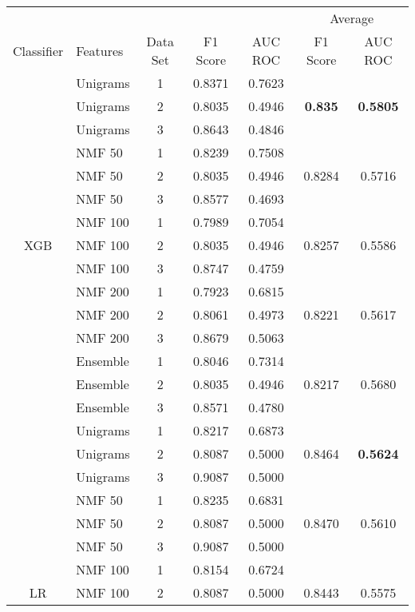 \documentclass[12pt, twoside]{article}
\begin{document}
\begin{table}[!htbp]
  \centering
  \begin{tabular}{clccccc}
  \toprule
  {} & {} &	{}	& {}	&	{} & \multicolumn{2}{c}{Average} \\
  \cmidrule(r){6-7}
  Classifier	&	Features	&	Data Set	&	F1 Score	&	AUC ROC	&	F1 Score	&	AUC ROC \\
  \midrule
  	&	Unigrams	&	1	&	0.8371	&	0.7623	&		&	 \\
  	&	Unigrams	&	2	&	0.8035	&	0.4946	&	\textbf{0.835}	&	\textbf{0.5805} \\
  	&	Unigrams	&	3	&	0.8643	&	0.4846	&		&	 \\
  	\cmidrule(r){2-7}
  	&	NMF 50	&	1	&	0.8239	&	0.7508	&		&	 \\
  	&	NMF 50	&	2	&	0.8035	&	0.4946	&	0.8284	&	0.5716 \\
  	&	NMF 50	&	3	&	0.8577	&	0.4693	&		&	 \\
  	\cmidrule(r){2-7}
  	&	NMF 100	&	1	&	0.7989	&	0.7054	&		&	 \\
  XGB	&	NMF 100	&	2	&	0.8035	&	0.4946	&	0.8257	&	0.5586 \\
  	&	NMF 100	&	3	&	0.8747	&	0.4759	&		&	 \\
  	\cmidrule(r){2-7}
  	&	NMF 200	&	1	&	0.7923	&	0.6815	&		&	 \\
  	&	NMF 200	&	2	&	0.8061	&	0.4973	&	0.8221	&	0.5617 \\
  	&	NMF 200	&	3	&	0.8679	&	0.5063	&		&	 \\
  	\cmidrule(r){2-7}
  	&	Ensemble	&	1	&	0.8046	&	0.7314	&		&	 \\
  	&	Ensemble	&	2	&	0.8035	&	0.4946	&	0.8217	&	0.5680 \\
  	&	Ensemble	&	3	&	0.8571	&	0.4780	&		&	 \\
  \midrule
  	&	Unigrams	&	1	&	0.8217	&	0.6873	&		&	 \\
  	&	Unigrams	&	2	&	0.8087	&	0.5000	&	0.8464	&	\textbf{0.5624} \\
  	&	Unigrams	&	3	&	0.9087	&	0.5000	&		&	 \\
  	\cmidrule(r){2-7}
  	&	NMF 50	&	1	&	0.8235	&	0.6831	&		&	 \\
  	&	NMF 50	&	2	&	0.8087	&	0.5000	&	0.8470	&	0.5610 \\
  	&	NMF 50	&	3	&	0.9087	&	0.5000	&		&	 \\
  	\cmidrule(r){2-7}
  	&	NMF 100	&	1	&	0.8154	&	0.6724	&		&	 \\
  LR	&	NMF 100	&	2	&	0.8087	&	0.5000	&	0.8443	&	0.5575 \\

\end{tabular}
\end{table}
\end{document}
